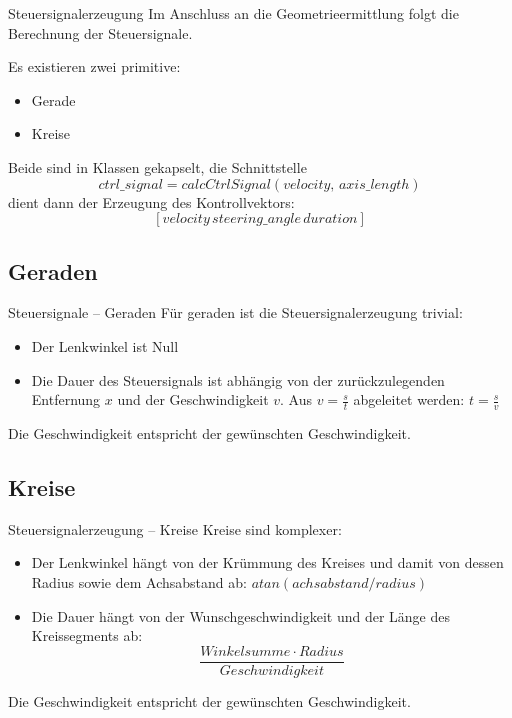 \begin{frame}{Steuersignalerzeugung}
Im Anschluss an die Geometrieermittlung folgt die Berechnung der Steuersignale.

Es existieren zwei primitive:
\begin{itemize}
\item Gerade
\item Kreise
\end{itemize}
Beide sind in Klassen gekapselt, die Schnittstelle
\[ctrl\_signal = calcCtrlSignal(velocity,\,axis\_length)\]
dient dann der Erzeugung des Kontrollvektors:
\[[velocity\,steering\_angle\,duration]\]
\end{frame}

\subsection{Geraden}
\begin{frame}{Steuersignale -- Geraden}
Für geraden ist die Steuersignalerzeugung trivial:
\begin{itemize}
\item Der Lenkwinkel ist Null
\item Die Dauer des Steuersignals ist abhängig von der zurückzulegenden Entfernung $x$ und der Geschwindigkeit $v$. Aus $v=\frac{s}{t}$ abgeleitet werden: $t=\frac{s}{v}$
\end{itemize}
Die Geschwindigkeit entspricht der gewünschten Geschwindigkeit.
\end{frame}

\subsection{Kreise}
\begin{frame}{Steuersignalerzeugung -- Kreise}
Kreise sind komplexer:
\begin{itemize}
\item Der Lenkwinkel hängt von der Krümmung des Kreises und damit von dessen Radius sowie dem Achsabstand ab:  $atan(achsabstand/radius)$
\item Die Dauer hängt von der Wunschgeschwindigkeit und der Länge des Kreissegments ab: \[\frac{Winkelsumme\cdot Radius}{Geschwindigkeit}\]
\end{itemize}
Die Geschwindigkeit entspricht der gewünschten Geschwindigkeit.
\end{frame}